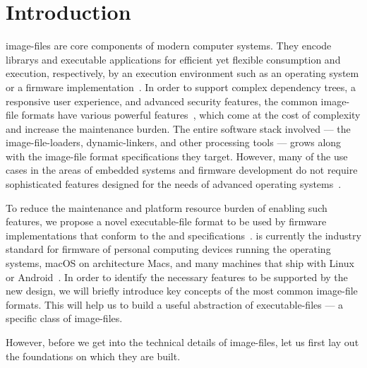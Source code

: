 \newtheorem{requirement}{Requirement}

\chapter{Introduction} %

\Glspl{image-file} are core components of modern computer systems. They encode \glspl{library} and executable applications for efficient yet flexible consumption and execution, respectively, by an execution environment such as an operating system or a \gls{firmware} implementation~\cite{os-concepts,pi-spec,uefi-spec}. In order to support complex dependency trees, a responsive user experience, and advanced security features, the common \gls{image-file} formats have various powerful features~\cite{elf-spec,macho-spec,pe-format}, which come at the cost of complexity and increase the maintenance burden. The entire software stack involved --- the \glspl{image-file-loader}, \glspl{dynamic-linker}, and other processing tools --- grows along with the \gls{image-file} format specifications they target. However, many of the use cases in the areas of embedded systems and \gls{firmware} development do not require sophisticated features designed for the needs of advanced operating systems~\cite{pi-spec,uefi-spec}.

To reduce the maintenance and platform resource burden of enabling such features, we propose a novel \gls{executable-file} format to be used by \gls{firmware} implementations that conform to the  and  specifications~\cite{pi-spec,uefi-spec}.  is currently the industry standard for \gls{firmware} of personal computing devices running the  operating systems,  macOS on  architecture Macs, and many machines that ship with Linux or Android~\cite{win10-hwreq,xnu,qc-uefi,linux}. In order to identify the necessary features to be supported by the new design, we will briefly introduce key concepts of the most common \gls{image-file} formats. This will help us to build a useful abstraction of  \glspl{executable-file} --- a specific class of \glspl{image-file}.

However, before we get into the technical details of \glspl{image-file}, let us first lay out the foundations on which they are built.

